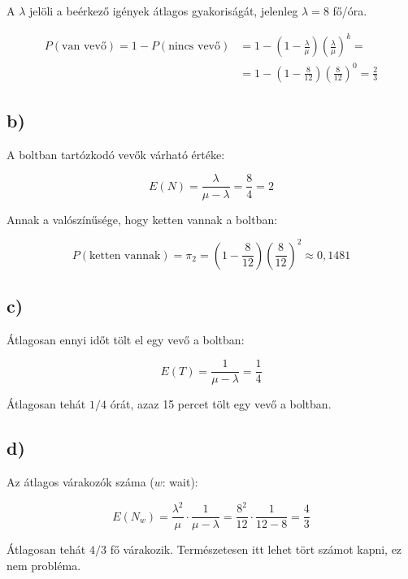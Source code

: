 \documentclass[a4paper,12pt]{article}
\begin{document}
A $\lambda$ jelöli a beérkező igények átlagos gyakoriságát, jelenleg
$\lambda = 8$ fő/óra.

\[
\begin{split}
P(\text{van vevő}) = 1 - P(\text{nincs vevő}) &= 
1 - \left( 1 - \frac{\lambda}{\mu} \right) 
\left( \frac{\lambda}{\mu} \right)^k = \\
&=1 - \left( 1 - \frac{8}{12} \right) 
\left( \frac{8}{12} \right)^0 = \frac{2}{3}
\end{split}
\]

\subsection*{b)}
A boltban tartózkodó vevők várható értéke:

\[
E(N) = \frac{\lambda}{\mu - \lambda} = \frac{8}{4} = 2
\]

Annak a valószínűsége, hogy ketten vannak a boltban: 

\[
P(\text{ketten vannak}) = \pi_2 = 
\left( 1 - \frac{8}{12} \right) 
\left( \frac{8}{12} \right)^2 \approx 0,1481
\]

\subsection*{c)}
Átlagosan ennyi időt tölt el egy vevő a boltban:

\[
E(T) = \frac{1}{\mu - \lambda} = \frac{1}{4}
\]

Átlagosan tehát $1/4$ órát, azaz 15 percet tölt egy vevő a boltban.

\subsection*{d)}
Az átlagos várakozók száma ($w$: wait):

\[
E(N_w) = \frac{\lambda^2}{\mu} \cdot \frac{1}{\mu - \lambda} =
\frac{8^2}{12} \cdot \frac{1}{12 - 8} = \frac{4}{3}
\]

Átlagosan tehát $4/3$ fő várakozik. Természetesen itt lehet tört
számot kapni, ez nem probléma.
\end{document}
